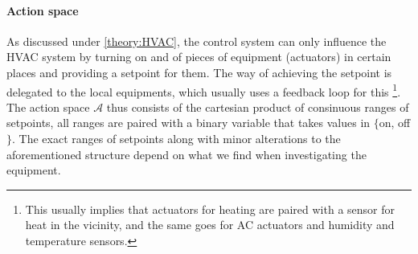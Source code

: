 \documentclass{article}
\theoremstyle{definition}
\theoremstyle{remark}
\newcommand{\act}{\mathcal{A}}
\begin{document}
\paragraph{Action space}\label{MDP:actions}
As discussed under \ref{theory:HVAC}, the control system can only influence the HVAC system by turning on and of pieces of equipment (actuators) in certain places and providing a setpoint for them. The way of achieving the setpoint is delegated to the local equipments, which usually uses a feedback loop for this \footnote{This usually implies that actuators for heating are paired with a sensor for heat in the vicinity, and the same goes for AC actuators and humidity and temperature sensors.}. The action space $\act$ thus consists of the cartesian product of consinuous ranges of setpoints, all ranges are paired with a binary variable that takes values in $\{$on, off$\}$. The exact ranges of setpoints along with minor alterations to the aforementioned structure depend on what we find when investigating the equipment.
\end{document}
